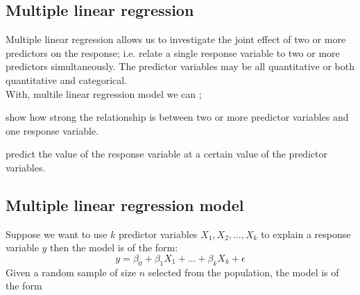 \documentclass[12pt]{article}
\numberwithin{equation}{section}
\begin{document}
\subsection{Multiple linear regression}
Multiple linear regression allows us to investigate the joint effect of two or more  predictors on the response; i.e. relate a single response variable to two or more  predictors simultaneously. The predictor variables may be all quantitative or both quantitative and categorical.\\
With, multile linear regression model we can  ;

\begin{bracketedromanenum}
	\item show how strong the relationship is between two or more predictor variables and one response variable.
	\item predict the value of the response variable at a certain value of the predictor variables.
\end{bracketedromanenum}

\subsection{Multiple linear regression model}

Suppose we want to use $k$ predictor variables $X_1, X_2, \ldots, X_k$ to explain a response variable $y$ then the model is of the form:
\begin{equation}
	y=\beta_0+\beta_1 X_1+\ldots+\beta_k X_k+\epsilon
	\label{eq:methodology_eq1}
\end{equation}
Given a random sample of size $n$ selected from the population, the model is of the form
\end{document}
